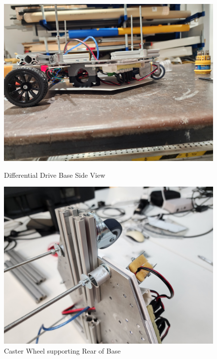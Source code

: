 \begin{figure}[H]
    \centering
    \begin{minipage}{0.45\textwidth}
        \centering
        \includegraphics[width=\textwidth]{Images/NewBaseDifferentialDrive (2).jpg}
        \caption{Differential Drive Base Side View}
        \label{fig:differential_base_side}
    \end{minipage}
    \hfill
    \begin{minipage}{0.45\textwidth}
        \centering
        \includegraphics[width=\textwidth]{Images/NewBaseDifferentialDrive (3).jpg}
        \caption{Caster Wheel supporting Rear of Base}
        \label{fig:differential_base_caster}
    \end{minipage}
\end{figure}

